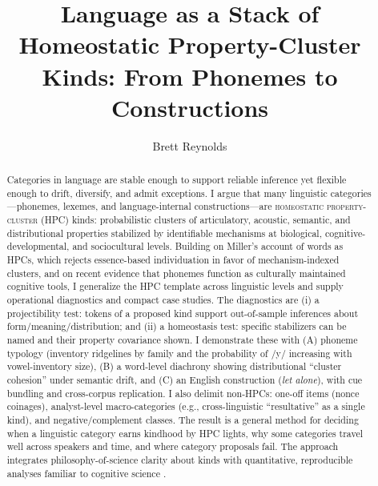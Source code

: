 \documentclass[12pt]{article}
\title{Language as a Stack of Homeostatic Property-Cluster Kinds: From Phonemes to Constructions}
\author{Brett Reynolds}
\date{}
\begin{document}
\maketitle

\begin{abstract}
\noindent Categories in language are stable enough to support reliable inference yet flexible enough to drift, diversify, and admit exceptions. I argue that many linguistic categories---phonemes, lexemes, and language-internal constructions---are \textsc{homeostatic property-cluster} (HPC) kinds: probabilistic clusters of articulatory, acoustic, semantic, and distributional properties stabilized by identifiable mechanisms at biological, cognitive-developmental, and sociocultural levels. Building on Miller's account of words as HPCs, which rejects essence-based individuation in favor of mechanism-indexed clusters, and on recent evidence that phonemes function as culturally maintained cognitive tools, I generalize the HPC template across linguistic levels and supply operational diagnostics and compact case studies. The diagnostics are (i) a projectibility test: tokens of a proposed kind support out-of-sample inferences about form/meaning/distribution; and (ii) a homeostasis test: specific stabilizers can be named and their property covariance shown. I demonstrate these with (A) phoneme typology (inventory ridgelines by family and the probability of /y/ increasing with vowel-inventory size), (B) a word-level diachrony showing distributional ``cluster cohesion'' under semantic drift, and (C) an English construction (\textit{let alone}), with cue bundling and cross-corpus replication. I also delimit non-HPCs: one-off items (nonce coinages), analyst-level macro-categories (e.g., cross-linguistic ``resultative'' as a single kind), and negative/complement classes. The result is a general method for deciding when a linguistic category earns kindhood by HPC lights, why some categories travel well across speakers and time, and where category proposals fail. The approach integrates philosophy-of-science clarity about kinds with quantitative, reproducible analyses familiar to cognitive science \citep{Miller2021WordsSpeciesKinds,Ekstrom2025PhonemeTool}.
\end{abstract}
\end{document}
